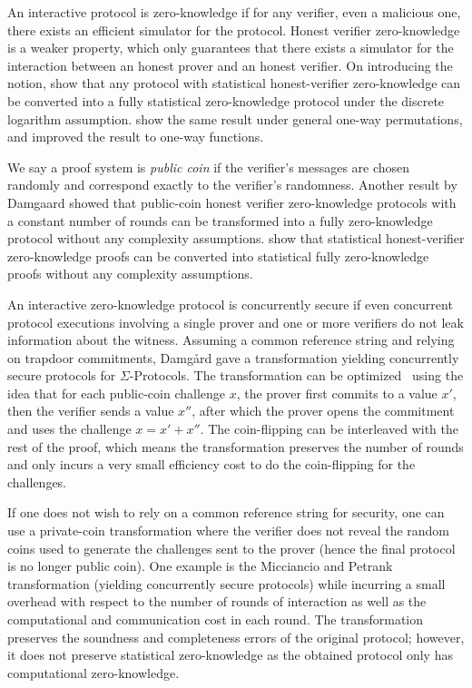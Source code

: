 An interactive protocol is zero-knowledge if for any verifier, even a malicious one, there exists an efficient simulator for the protocol. Honest verifier zero-knowledge \cite{BellareMO90a} is a weaker property, which only guarantees that there exists a simulator for the interaction between an honest prover and an honest verifier. On introducing the notion, \cite{BellareMO90a} show that any protocol with statistical honest-verifier zero-knowledge can be converted into a fully statistical zero-knowledge protocol under the discrete logarithm assumption. \cite{OstrovskyVY93} show the same result under general one-way permutations, and \cite{Okamoto00} improved the result to one-way functions.

We say a proof system is \emph{public coin} if the verifier's messages are chosen randomly and correspond exactly to the verifier's randomness. Another result by Damgaard \cite{Damgard93} showed that public-coin honest verifier zero-knowledge protocols with a constant number of rounds can be transformed into a fully zero-knowledge protocol without any complexity assumptions. \cite{GoldreichSV98} show that statistical honest-verifier zero-knowledge proofs can be converted into statistical fully zero-knowledge proofs without any complexity assumptions.

An interactive zero-knowledge protocol is concurrently secure if even concurrent protocol executions involving a single prover and one or more verifiers do not leak information about the witness. Assuming a common reference string and relying on trapdoor commitments, Damg{\aa}rd \cite{Damgard2000} gave a transformation yielding concurrently secure protocols for $\Sigma$-Protocols. The transformation can be optimized~\cite{dissertation} using the idea that for each public-coin challenge $x$, the prover first commits to a value $x'$, then the verifier sends a value $x''$, after which the prover opens the commitment and uses the challenge $x=x'+x''$. The coin-flipping can be interleaved with the rest of the proof, which means the transformation preserves the number of rounds and only incurs a very small efficiency cost to do the coin-flipping for the challenges. 

If one does not wish to rely on a common reference string for security, one can use a private-coin transformation where the verifier
does not reveal the random coins used to generate the challenges sent to the prover (hence the final protocol is no longer public coin).
One example is the Micciancio and Petrank \cite{MP03} transformation (yielding concurrently secure protocols) while incurring a small overhead
with respect to the number of rounds of interaction as well as the computational and communication cost in each round. %
The transformation preserves the soundness and completeness errors of the original protocol; however, it does not preserve statistical zero-knowledge as the obtained protocol only has computational zero-knowledge. 

